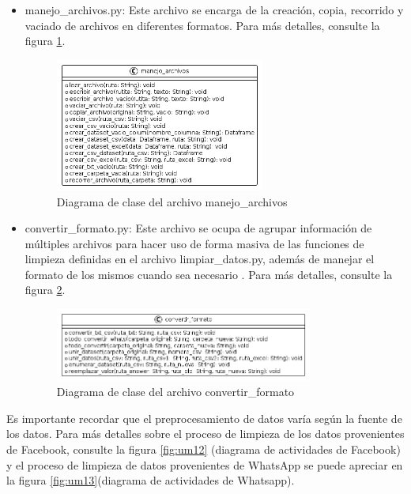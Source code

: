 \begin{itemize}

\item manejo\_archivos.py: Este archivo se encarga de la creación, copia, recorrido y vaciado de archivos en diferentes formatos. Para más detalles, consulte la figura \ref{fig:uml3}.

\begin{figure}
	\includegraphics[width=0.65\textwidth]{capitulo5/figuras/fig3.png}
	\caption{Diagrama de clase del archivo manejo\_archivos}
	\label{fig:uml3}
\end{figure}


\item convertir\_formato.py: Este archivo se ocupa de agrupar información de múltiples archivos para hacer uso de forma masiva de las funciones de limpieza definidas en el archivo limpiar\_datos.py, además de manejar el formato de los mismos cuando sea necesario . Para más detalles, consulte la figura \ref{fig:uml4}.

\begin{figure}
	\includegraphics[width=0.8\textwidth]{capitulo5/figuras/fig4.png}
	\caption{Diagrama de clase del archivo convertir\_formato}
	\label{fig:uml4}
\end{figure}

\end{itemize}

Es importante recordar que el preprocesamiento de datos varía según la fuente de los datos. Para más detalles sobre el proceso de limpieza de los datos provenientes de Facebook, consulte la figura \ref{fig:um12} (diagrama de actividades de Facebook) y el proceso de limpieza de datos provenientes de WhatsApp se puede apreciar en la figura \ref{fig:um13}(diagrama de actividades de Whatsapp).

